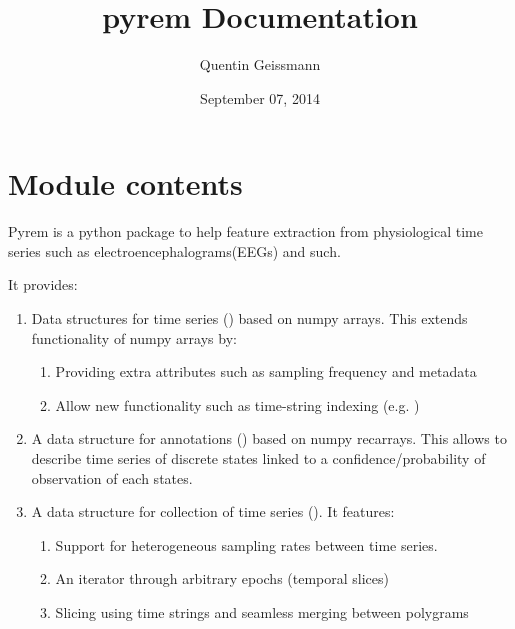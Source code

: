 \documentclass[letterpaper,10pt,english]{sphinxmanual}
\title{pyrem Documentation}
\date{September 07, 2014}
\author{Quentin Geissmann}
\begin{document}
\maketitle
\tableofcontents
{}\label{index::doc}



\chapter{Module contents}
\label{index:module-contents}\label{index:welcome-to-pyrem-s-documentation}\label{index:module-pyrem}
Pyrem is a python package to help feature extraction from physiological time series such as electroencephalograms(EEGs) and such.

It provides:
\begin{enumerate}
\item {} 
Data structures for time series ({\hyperref[pyrem.time_series:module-pyrem.time_series]{}}) based on numpy arrays. This extends functionality of numpy arrays by:
\begin{enumerate}
\item {} 
Providing extra attributes such as sampling frequency and metadata

\item {} 
Allow new functionality such as time-string indexing (e.g. )

\end{enumerate}

\item {} 
A data structure for annotations ({\hyperref[pyrem.time_series:pyrem.time_series.Annotation]{}}) based on numpy recarrays. This allows to describe time series of discrete states linked to a confidence/probability of observation of each states.

\item {} 
A data structure for collection of time series ({\hyperref[pyrem.polygram:module-pyrem.polygram]{}}). It features:
\begin{enumerate}
\item {} 
Support for heterogeneous sampling rates between time series.

\item {} 
An iterator through arbitrary epochs (temporal slices)

\item {} 
Slicing using time strings and seamless merging between polygrams


\end{enumerate}
\end{enumerate}
\end{document}
